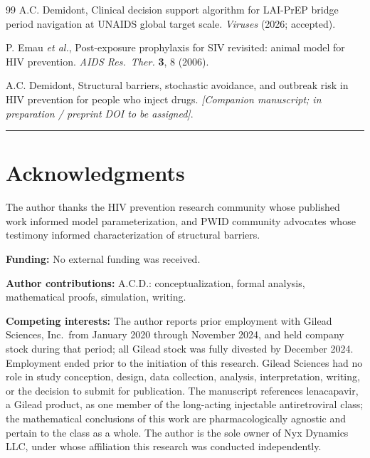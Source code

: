 \documentclass[11pt]{article}
\theoremstyle{definition}
\theoremstyle{remark}
\begin{document}
\begin{thebibliography}{99}
A.C. Demidont, Clinical decision support algorithm for LAI-PrEP bridge period navigation at UNAIDS global target scale. \textit{Viruses} (2026; accepted).

P. Emau \textit{et al.}, Post-exposure prophylaxis for SIV revisited: animal model for HIV prevention. \textit{AIDS Res.\ Ther.} \textbf{3}, 8 (2006).

A.C. Demidont, Structural barriers, stochastic avoidance, and outbreak risk in HIV prevention for people who inject drugs. \textit{[Companion manuscript; in preparation / preprint DOI to be assigned]}.

\end{thebibliography}

\vspace{1em}
\hrule
\vspace{0.5em}

\section*{Acknowledgments}
The author thanks the HIV prevention research community whose published work informed model parameterization, and PWID community advocates whose testimony informed characterization of structural barriers.

\textbf{Funding:} No external funding was received.

\textbf{Author contributions:} A.C.D.: conceptualization, formal analysis, mathematical proofs, simulation, writing.

\textbf{Competing interests:} The author reports prior employment with Gilead Sciences, Inc.\ from January 2020 through November 2024, and held company stock during that period; all Gilead stock was fully divested by December 2024. Employment ended prior to the initiation of this research. Gilead Sciences had no role in study conception, design, data collection, analysis, interpretation, writing, or the decision to submit for publication. The manuscript references lenacapavir, a Gilead product, as one member of the long-acting injectable antiretroviral class; the mathematical conclusions of this work are pharmacologically agnostic and pertain to the class as a whole. The author is the sole owner of Nyx Dynamics LLC, under whose affiliation this research was conducted independently.
\end{document}
